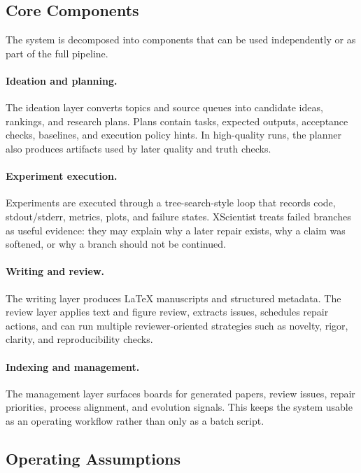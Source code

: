 \documentclass[11pt]{article}
\begin{document}
\subsection{Core Components}

The system is decomposed into components that can be used independently or as
part of the full pipeline.

\paragraph{Ideation and planning.}
The ideation layer converts topics and source queues into candidate ideas,
rankings, and research plans. Plans contain tasks, expected outputs,
acceptance checks, baselines, and execution policy hints. In high-quality
runs, the planner also produces artifacts used by later quality and truth
checks.

\paragraph{Experiment execution.}
Experiments are executed through a tree-search-style loop that records code,
stdout/stderr, metrics, plots, and failure states. XScientist treats failed
branches as useful evidence: they may explain why a later repair exists, why a
claim was softened, or why a branch should not be continued.

\paragraph{Writing and review.}
The writing layer produces LaTeX manuscripts and structured metadata. The
review layer applies text and figure review, extracts issues, schedules repair
actions, and can run multiple reviewer-oriented strategies such as novelty,
rigor, clarity, and reproducibility checks.

\paragraph{Indexing and management.}
The management layer surfaces boards for generated papers, review issues,
repair priorities, process alignment, and evolution signals. This keeps the
system usable as an operating workflow rather than only as a batch script.

\subsection{Operating Assumptions}
\end{document}
